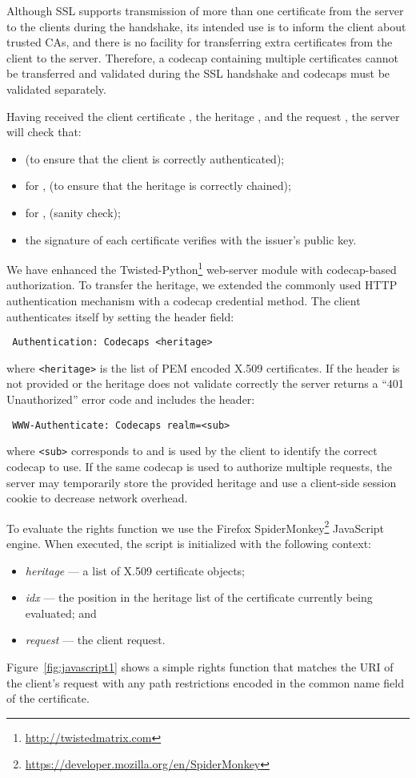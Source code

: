 \documentclass[10pt, conference, compsocconf]{IEEEtran}
\begin{document}
Although SSL supports transmission of more than one
certificate from the server to the clients during the handshake,
its intended use is to inform the client about trusted CAs,
and there is no facility for transferring extra certificates
from the client to the server.  Therefore, a codecap containing
multiple certificates cannot be transferred and validated during
the SSL handshake and codecaps must be validated separately.

Having received the client certificate , the heritage ,
and the request , the server will check that:

\begin{itemize}
\item  (to ensure that
the client is correctly authenticated);

\item for , 
(to ensure that the heritage is correctly chained);

\item for , 
(sanity check);

\item the signature of each certificate verifies with the issuer's public key.

\end{itemize}


We have enhanced the Twisted-Python\footnote{\url{http://twistedmatrix.com}}
web-server module with codecap-based authorization.
To transfer the heritage, we extended the commonly used HTTP authentication
mechanism with a codecap credential method.
The client authenticates itself by setting the header field:
\begin{verbatim}
 Authentication: Codecaps <heritage>
\end{verbatim}
where \texttt{<heritage>} is the list of PEM encoded X.509 certificates.
If the header is not provided or the heritage does not validate correctly the server returns a ``401 Unauthorized'' error code and includes the header:
\begin{verbatim}
 WWW-Authenticate: Codecaps realm=<sub> 
\end{verbatim}
where \texttt{<sub>} corresponds to  and
is used by the client to identify the correct codecap to use.  If
the same codecap is used to authorize multiple requests, the server
may temporarily store the provided heritage and use a client-side
session cookie to decrease network overhead.

To evaluate the rights function we use the Firefox
SpiderMonkey\footnote{\url{https://developer.mozilla.org/en/SpiderMonkey}}
JavaScript engine. 
When executed, the script is initialized with the following context:
\begin{itemize}
\item \emph{heritage} --- a list of X.509 certificate objects;
\item \emph{idx} --- the position in the heritage list of the certificate currently being evaluated; and
\item \emph{request} --- the client request.
\end{itemize}
Figure~\ref{fig:javascript1} shows a simple rights function that matches the URI of the client's request with
any path restrictions encoded in the common name field of the certificate. 
\end{document}
